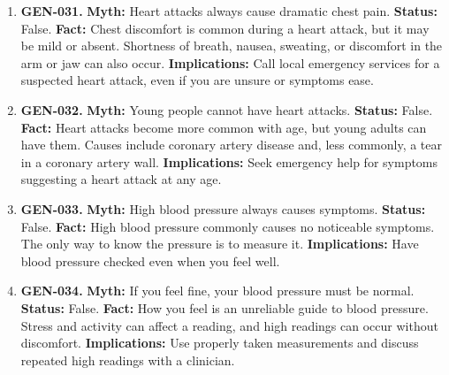 \documentclass[11pt,oneside]{book}
\begin{document}
\begin{enumerate}[leftmargin=0pt,labelwidth=0pt,labelsep=0pt,itemindent=0pt]
\textbf{Status:} False.\newline
\textbf{Fact:} Heart disease affects women as well as men and is a major cause of death in both. Risk varies with age, blood pressure, smoking, diabetes, and other factors. \cite{ref46}\newline
\textbf{Implications:} Consider your own risk factors when discussing prevention.
\item[] \textbf{GEN-031.} \textbf{Myth:} Heart attacks always cause dramatic chest pain.\newline
\textbf{Status:} False.\newline
\textbf{Fact:} Chest discomfort is common during a heart attack, but it may be mild or absent. Shortness of breath, nausea, sweating, or discomfort in the arm or jaw can also occur. \cite{ref46}\newline
\textbf{Implications:} Call local emergency services for a suspected heart attack, even if you are unsure or symptoms ease.
\item[] \textbf{GEN-032.} \textbf{Myth:} Young people cannot have heart attacks.\newline
\textbf{Status:} False.\newline
\textbf{Fact:} Heart attacks become more common with age, but young adults can have them. Causes include coronary artery disease and, less commonly, a tear in a coronary artery wall. \cite{ref46,ref247}\newline
\textbf{Implications:} Seek emergency help for symptoms suggesting a heart attack at any age.
\item[] \textbf{GEN-033.} \textbf{Myth:} High blood pressure always causes symptoms.\newline
\textbf{Status:} False.\newline
\textbf{Fact:} High blood pressure commonly causes no noticeable symptoms. The only way to know the pressure is to measure it. \cite{ref272}\newline
\textbf{Implications:} Have blood pressure checked even when you feel well.
\item[] \textbf{GEN-034.} \textbf{Myth:} If you feel fine, your blood pressure must be normal.\newline
\textbf{Status:} False.\newline
\textbf{Fact:} How you feel is an unreliable guide to blood pressure. Stress and activity can affect a reading, and high readings can occur without discomfort. \cite{ref272}\newline
\textbf{Implications:} Use properly taken measurements and discuss repeated high readings with a clinician.

\end{enumerate}
\end{document}
